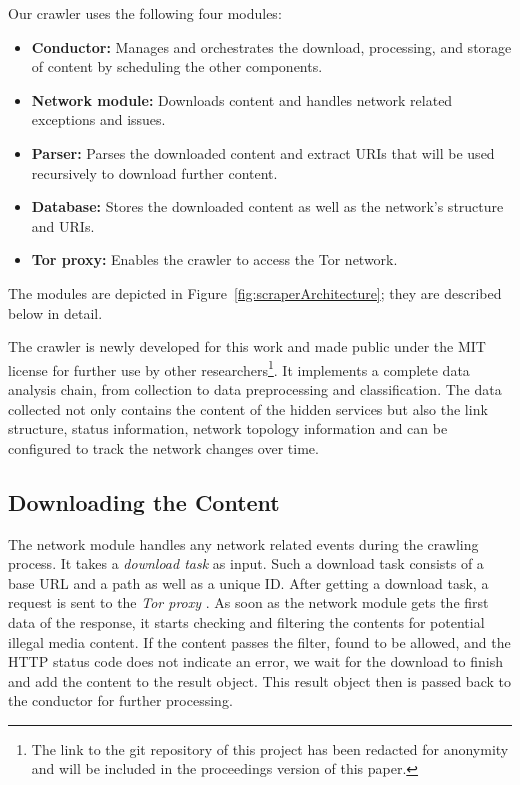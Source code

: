 \documentclass[USenglish,oneside,twocolumn]{article}
\begin{document}
Our crawler uses the following four modules:
\begin{itemize}
    \item \textbf{Conductor:} Manages and orchestrates the download, processing, and storage of content by scheduling the other components.
    \item \textbf{Network module:} Downloads content and handles network related exceptions and issues.
    \item \textbf{Parser:} Parses the downloaded content and extract URIs that will be used recursively to download further content.
    \item \textbf{Database:} Stores the downloaded content as well as the network's structure and URIs.
    \item \textbf{Tor proxy:} Enables the crawler to access the Tor network. 
\end{itemize}

The modules are depicted in Figure~\ref{fig:scraperArchitecture}; they are described below in detail.

The crawler is newly developed for this work and made public under the MIT license for further use by other researchers\footnote{The link to the git repository of this project has been redacted for anonymity and will be included in the proceedings version of this paper.}. It implements a complete data analysis chain, from collection to data preprocessing and classification. The data collected not only contains the content of the hidden services but also the link structure, status information, network topology information and can be configured to track the network changes over time.
%
%
\subsection{Downloading the Content}
\label{sec:MIMEType}
The network module handles any network related events during the crawling process. It takes a \emph{download task} as input. Such a download task consists of a base URL and a path as well as a unique ID. After getting a download task, a request is sent to the \emph{Tor proxy} \cite{Boyd}. As soon as the network module gets the first data of the response, it starts checking and filtering the contents for potential illegal media content. If the content passes the filter, found to be allowed, and the HTTP status code does not indicate an error, we wait for the download to finish and add the content to the result object. This result object then is passed back to the conductor for further processing.
\end{document}
